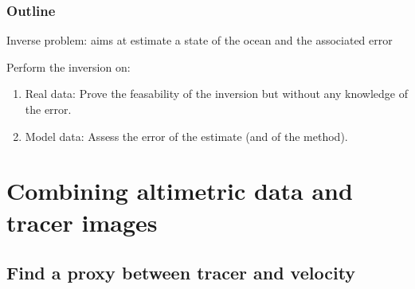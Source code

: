 \documentclass[compress,slidescentered,notes=show]{beamer}
\begin{document}
\begin{frame}
  \frametitle{Outline}

  \begin{block}{}
    Inverse problem: aims at estimate a state of the ocean and the associated error
  \end{block}
 
  \begin{block}{Perform the inversion on:}
  \begin{enumerate}
    \item Real data: Prove the feasability of the inversion but without any knowledge of the error.%
    \item Model data: Assess the error of the estimate (and of the method). 
  \end{enumerate}
  \end{block}
\end{frame}

\section[Method]{Combining altimetric data and tracer images}

\subsection[proxy FSLE]{Find a proxy between tracer and velocity}
\end{document}
